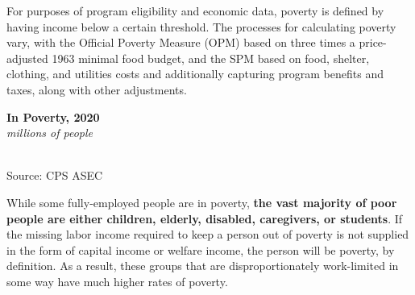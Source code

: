 \documentclass{report}
\newcommand{\barylab}[2]{yticklabel style={text width=#1, align=right, 
		style={black!70}, text height=#2},}
\newcommand{\bbar}[2]{extra #1 ticks = {{#2}}, extra #1 tick labels = ,
		extra #1 tick style = {grid=major, grid style={thick, black!25}},}
\newcommand{\barplotnogrid}{xbar=0pt, axis line style={draw=none},
	    yticklabel style={align=left, anchor=east},
      		xmajorticks=false, ymajorgrids=false,   
	    ytick=data, tickwidth=0pt, area legend, reverse legend,
	    nodes near coords align={horizontal},}
\begin{document}
{\begin{minipage}{0.76\textwidth}
For purposes of program eligibility and economic data, poverty is defined by having income below a certain threshold. The processes for calculating poverty vary, with the Official Poverty Measure (OPM) based on three times a price-adjusted 1963 minimal food budget, and the SPM based on food, shelter, clothing, and utilities costs and additionally capturing program benefits and taxes, along with other adjustments.
\end{minipage} \hspace{6mm}
\begin{minipage}{0.24\textwidth}
\normalsize \textbf{In Poverty, 2020}\\
\footnotesize{\textit{millions of people}}\\
  \hspace*{-4mm} \\
\footnotesize{Source: CPS ASEC}
\vfill
\end{minipage}
\vspace{1mm}

\begin{minipage}{0.76\textwidth}
\small While some fully-employed people are in poverty, \textbf{the vast majority of poor people are either children, elderly, disabled, caregivers, or students}.  If the missing labor income required to keep a person out of poverty is not supplied in the form of capital income or welfare income, the person will be poverty, by definition. As a result, these groups that are disproportionately work-limited in some way have much higher rates of poverty. 
\vspace{1mm}


\end{minipage}}
\end{document}
